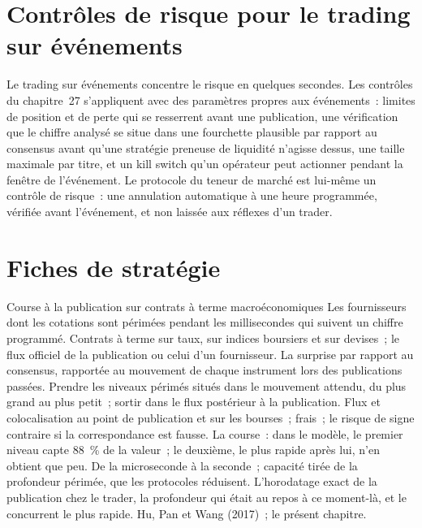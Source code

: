 \section{Contrôles de risque pour le trading sur événements}

Le trading sur événements concentre le risque en quelques secondes. Les contrôles du chapitre~27 s'appliquent avec des paramètres propres aux événements~: limites de position et de perte qui se resserrent
avant une publication, une vérification que le chiffre analysé se situe dans une fourchette plausible par rapport au consensus avant qu'une stratégie preneuse de liquidité n'agisse dessus, une taille maximale
par titre, et un kill switch qu'un opérateur peut actionner pendant la fenêtre de l'événement. Le protocole du teneur de marché est lui-même un contrôle de risque~: une
annulation automatique à une heure programmée, vérifiée avant l'événement, et non laissée aux réflexes d'un trader.

\section{Fiches de stratégie}

\begin{strategyfile}{Course à la publication sur contrats à terme macroéconomiques}\label{strat:hf:news-and-event-trading:macro}
 Les fournisseurs dont les cotations sont périmées pendant les millisecondes qui suivent un chiffre programmé.
 Contrats à terme sur taux, sur indices boursiers et sur devises~; le flux officiel de la publication ou celui d'un fournisseur.
 La surprise par rapport au consensus, rapportée au mouvement de chaque instrument lors des publications passées.
 Prendre les niveaux périmés situés dans le mouvement attendu, du plus grand au plus petit~; sortir dans le flux postérieur à la publication.
 Flux et colocalisation au point de publication et sur les bourses~; frais~; le risque de signe contraire si la correspondance est fausse.
 La course~: dans le modèle, le premier niveau capte 88~\% de la valeur~; le deuxième, le plus rapide après lui, n'en obtient que peu.
 De la microseconde à la seconde~; capacité tirée de la profondeur périmée, que les protocoles réduisent.
 L'horodatage exact de la publication chez le trader, la profondeur qui était au repos à ce moment-là, et le concurrent le plus rapide.
 Hu, Pan et Wang (2017)~; le présent chapitre.
\end{strategyfile}

